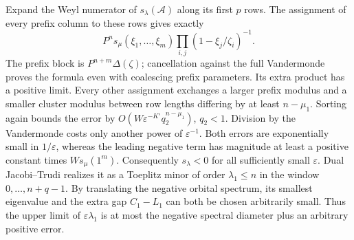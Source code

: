 Expand the Weyl numerator of $s_\lambda(\mathcal A)$ along its
first $p$ rows.  The assignment of every prefix column to these
rows gives exactly
\[
 P^n s_\mu(\xi_1,\ldots,\xi_m)
       \prod_{i,j}(1-\xi_j/\zeta_i)^{-1}.
\]
The prefix block is $P^{n+m}\Delta(\zeta)$; cancellation against
the full Vandermonde proves the formula even with coalescing prefix
parameters.  Its extra product has a positive limit.
Every other assignment exchanges a larger prefix modulus and a
smaller cluster modulus between row lengths differing by at least
$n-\mu_1$.  Sorting again bounds the error by
$O(W\varepsilon^{-K'}q_2^{n-\mu_1})$, $q_2<1$.
Division by the Vandermonde costs only another power of
$\varepsilon^{-1}$.  Both errors are exponentially small in
$1/\varepsilon$, whereas the leading negative term has magnitude
at least a positive constant times $W s_\mu(1^m)$.
Consequently $s_\lambda<0$ for all sufficiently small $\varepsilon$.
Dual Jacobi--Trudi realizes it as a Toeplitz minor of order
$\lambda_1\le n$ in the window $0,\ldots,n+q-1$.
By translating the negative orbital spectrum, its smallest eigenvalue
and the extra gap $C_1-L_1$ can both be chosen arbitrarily small.
Thus the upper limit of $\varepsilon\lambda_1$ is at most the
negative spectral diameter plus an arbitrary positive error.

